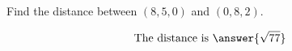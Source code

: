 \documentclass{ximera}
\author{Bart Snapp}
\begin{document}
\begin{exercise}
  Find the distance between $(8,5,0)$ and $(0,8,2)$.
  \begin{prompt}
  \[
  \text{The distance is }\answer{\sqrt{77}}
  \]
  \end{prompt}
\end{exercise}
\end{document}
